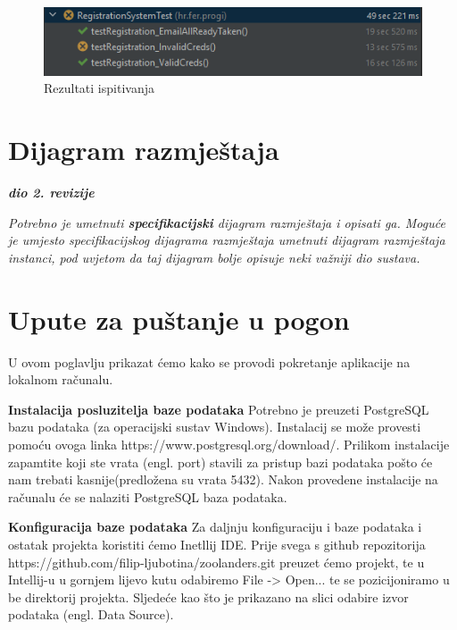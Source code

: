 			\begin{figure}[H]
				\includegraphics[scale=1]{slike/registrationTests.png} 
				\centering
				\caption{Rezultati ispitivanja}
				\label{fig:promjene}
			\end{figure}
			
			\eject 
		
		
		\section{Dijagram razmještaja}
			
			\textbf{\textit{dio 2. revizije}}
			
			 \textit{Potrebno je umetnuti \textbf{specifikacijski} dijagram razmještaja i opisati ga. Moguće je umjesto specifikacijskog dijagrama razmještaja umetnuti dijagram razmještaja instanci, pod uvjetom da taj dijagram bolje opisuje neki važniji dio sustava.}
			
			\eject 
		
		\section{Upute za puštanje u pogon}
		
			U ovom poglavlju prikazat ćemo kako se provodi pokretanje aplikacije na lokalnom računalu.
			
			\textbf{Instalacija posluzitelja baze podataka}
			Potrebno je preuzeti PostgreSQL bazu podataka (za operacijski sustav Windows). Instalacij se može provesti pomoću ovoga linka https://www.postgresql.org/download/. Prilikom instalacije zapamtite koji ste vrata (engl. port) stavili za pristup bazi podataka pošto će nam trebati kasnije(predložena su vrata 5432). Nakon provedene instalacije na računalu će se nalaziti PostgreSQL baza podataka.
			
			\textbf{Konfiguracija baze podataka}
			Za daljnju konfiguraciju i baze podataka i ostatak projekta koristiti ćemo Inetllij IDE. Prije svega s github repozitorija https://github.com/filip-ljubotina/zoolanders.git preuzet ćemo projekt, te u Intellij-u u gornjem lijevo kutu odabiremo File -> Open... te se pozicijoniramo u be direktorij projekta. Sljedeće kao što je prikazano na slici odabire izvor podataka (engl. Data Source).
			
